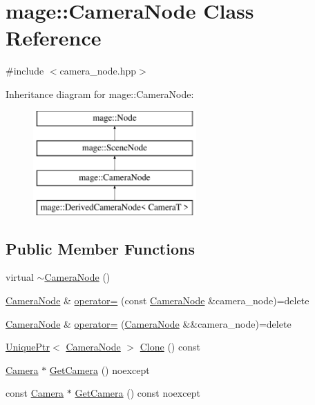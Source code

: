 \hypertarget{classmage_1_1_camera_node}{}\section{mage\+:\+:Camera\+Node Class Reference}
\label{classmage_1_1_camera_node}


{\ttfamily \#include $<$camera\+\_\+node.\+hpp$>$}

Inheritance diagram for mage\+:\+:Camera\+Node\+:\begin{figure}[H]
\begin{center}
\leavevmode
\includegraphics[height=4.000000cm]{classmage_1_1_camera_node}
\end{center}
\end{figure}
\subsection*{Public Member Functions}
\begin{DoxyCompactItemize}
\item 
virtual \hyperlink{classmage_1_1_camera_node_ac6612668e7b9f829e371794d422d357f}{$\sim$\+Camera\+Node} ()
\item 
\hyperlink{classmage_1_1_camera_node}{Camera\+Node} \& \hyperlink{classmage_1_1_camera_node_a03442d51e4279717f6692e0a731967a1}{operator=} (const \hyperlink{classmage_1_1_camera_node}{Camera\+Node} \&camera\+\_\+node)=delete
\item 
\hyperlink{classmage_1_1_camera_node}{Camera\+Node} \& \hyperlink{classmage_1_1_camera_node_a8da019549eeac6c4d7d6d7c4017dd498}{operator=} (\hyperlink{classmage_1_1_camera_node}{Camera\+Node} \&\&camera\+\_\+node)=delete
\item 
\hyperlink{namespacemage_a8c307fbcc33bce9b7f2aa4c26c3b95cf}{Unique\+Ptr}$<$ \hyperlink{classmage_1_1_camera_node}{Camera\+Node} $>$ \hyperlink{classmage_1_1_camera_node_a6c636830efadf9753f2f0d012153d61f}{Clone} () const
\item 
\hyperlink{classmage_1_1_camera}{Camera} $\ast$ \hyperlink{classmage_1_1_camera_node_aa9887e3bf192d6c078aae2430732cbf8}{Get\+Camera} () noexcept
\item 
const \hyperlink{classmage_1_1_camera}{Camera} $\ast$ \hyperlink{classmage_1_1_camera_node_aa911263cfce8cec2a42c6d03d25af606}{Get\+Camera} () const noexcept
\end{DoxyCompactItemize}
